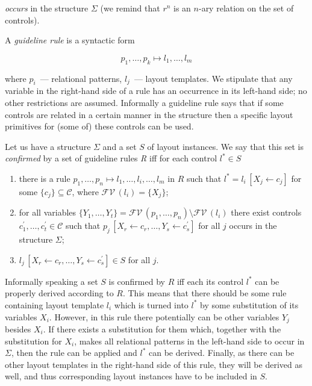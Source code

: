 \noindent \emph{occurs} in the structure $\Sigma$ (we remind that $r^n$ is an $n$-ary relation on the set of controls).


A \emph{guideline rule} is a syntactic form

\[
p_1,\dots,p_k\mapsto l_1,\dots,l_m
\]


\noindent  where $p_i$~--- relational patterns, $l_j$~--- layout templates. We stipulate that any variable in the right-hand side of a
rule has an occurrence in its left-hand side; no other restrictions are assumed. Informally a guideline rule says that if
some controls are related in a certain manner in the structure then a specific layout primitives for (some of) these
controls can be used.





Let us have a structure $\Sigma$ and a set $S$ of layout instances. We say that this set is \emph{confirmed} by a set of
guideline rules \emph{R} iff for each control $l^*\in S$

\begin{enumerate}
\item there is a rule $p_1,\dots,p_n\mapsto l_1,\dots,l_i,\dots, l_m$ in $R$
  such that $l^*=l_i\,[X_j\gets c_j]$  for
  some $\{c_j\}\subseteq\mathcal{C}$, where $\mathcal{FV}\,(l_i)=\{X_j\}$;

\item for all variables $\{Y_1,\dots,Y_t\}=\mathcal{FV}\,(p_1,\dots,p_n)\setminus\mathcal{FV}\,(l_i)$ there exist
  controls $c^\prime_1,\dots,c^\prime_t\in\mathcal{C}$ such that \mbox{$p_j\,[X_r\gets c_r,\dots,Y_s\gets c^\prime_s]$}
  for all $j$ occurs in the structure $\Sigma$;

\item \mbox{$l_j\,[X_r\gets c_r,\dots,Y_s\gets c^\prime_s]\in S$} for all $j$.

\end{enumerate}

Informally speaking a set $S$ is confirmed by $R$ iff each its control $l^*$ can be properly
derived according to $R$. This means that there should be some rule containing
layout template $l_i$ which is turned into $l^*$ by some substitution of its
variables $X_i$. However, in this rule there potentially can be other variables $Y_j$ besides $X_i$.
If there exists a substitution for them which, together with the substitution for $X_i$, makes all
relational patterns in the left-hand side to occur in $\Sigma$, then the rule can be
applied and $l^*$ can be derived. Finally, as there can be other layout templates in the
right-hand side of this rule, they will be derived as well, and thus corresponding
layout instances have to be included in $S$.

